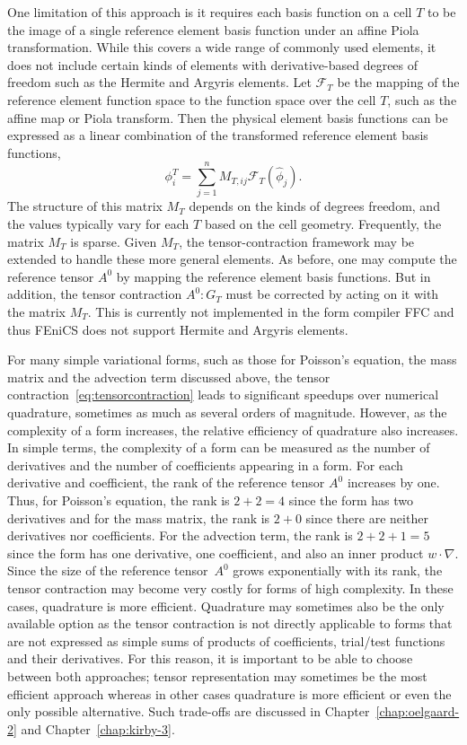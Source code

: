 One limitation of this approach is it requires each basis function on
a cell \( T \) to be the image of a single reference element basis
function under an affine Piola transformation. While this covers a
wide range of commonly used elements, it does not include certain
kinds of elements with derivative-based degrees of freedom such as the
Hermite and Argyris elements. Let \( \mathcal{F}_T \) be the mapping
of the reference element function space to the function space over the
cell $T$, such as the affine map or Piola transform. Then the physical
element basis functions can be expressed as a linear combination of
the transformed reference element basis functions,
\begin{equation}
  \phi^T_i = \sum_{j=1}^n M_{T,{ij}} \mathcal{F}_T \left( \hat{\phi}_j \right).
\end{equation}
The structure of this matrix \( M_T \) depends on the kinds of degrees
freedom, and the values typically vary for each \( T \) based on the
cell geometry.  Frequently, the matrix $M_T$ is sparse. Given \( M_T
\), the tensor-contraction framework may be extended to handle these
more general elements.  As before, one may compute the reference
tensor \( A^0 \) by mapping the reference element basis functions. But
in addition, the tensor contraction \( A^0 : G_T \) must be corrected
by acting on it with the matrix \( M_T \). This is currently not
implemented in the form compiler FFC and thus FEniCS does not support
Hermite and Argyris elements.

For many simple variational forms, such as those for Poisson's
equation, the mass matrix and the advection term discussed above, the
tensor contraction~\eqref{eq:tensorcontraction} leads to significant
speedups over numerical quadrature, sometimes as much as several
orders of magnitude.  However, as the complexity of a form increases,
the relative efficiency of quadrature also increases. In simple terms,
the complexity of a form can be measured as the number of derivatives
and the number of coefficients appearing in a form. For each
derivative and coefficient, the rank of the reference tensor $A^0$
increases by one. Thus, for Poisson's equation, the rank is $2 + 2 =
4$ since the form has two derivatives and for the mass matrix, the
rank is $2 + 0$ since there are neither derivatives nor
coefficients. For the advection term, the rank is $2 + 2 + 1 = 5$
since the form has one derivative, one coefficient, and also an inner
product $w \cdot \nabla$. Since the size of the reference tensor~$A^0$
grows exponentially with its rank, the tensor contraction may become
very costly for forms of high complexity. In these cases, quadrature
is more efficient. Quadrature may sometimes also be the only available
option as the tensor contraction is not directly applicable to forms
that are not expressed as simple sums of products of coefficients,
trial/test functions and their derivatives. For this reason, it is
important to be able to choose between both approaches; tensor
representation may sometimes be the most efficient approach whereas in
other cases quadrature is more efficient or even the only possible
alternative.  Such trade-offs are discussed in
Chapter~\ref{chap:oelgaard-2} and Chapter~\ref{chap:kirby-3}.
